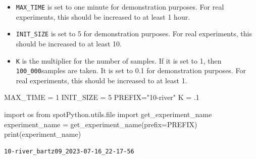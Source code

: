 \documentclass[
  letterpaper,
  DIV=11,
  numbers=noendperiod]{scrreprt}
\newenvironment{Shaded}{\begin{snugshade}}{\end{snugshade}}
\newcommand{\BuiltInTok}[1]{\textcolor[rgb]{0.00,0.23,0.31}{#1}}
\newcommand{\DecValTok}[1]{\textcolor[rgb]{0.68,0.00,0.00}{#1}}
\newcommand{\FloatTok}[1]{\textcolor[rgb]{0.68,0.00,0.00}{#1}}
\newcommand{\ImportTok}[1]{\textcolor[rgb]{0.00,0.46,0.62}{#1}}
\newcommand{\NormalTok}[1]{\textcolor[rgb]{0.00,0.23,0.31}{#1}}
\newcommand{\OperatorTok}[1]{\textcolor[rgb]{0.37,0.37,0.37}{#1}}
\newcommand{\StringTok}[1]{\textcolor[rgb]{0.13,0.47,0.30}{#1}}
\providecommand{\tightlist}{%
  \setlength{\itemsep}{0pt}\setlength{\parskip}{0pt}}\usepackage{longtable,booktabs,array}
\begin{document}
\begin{tcolorbox}[enhanced jigsaw, left=2mm, title=\textcolor{quarto-callout-caution-color}{\faFire}\hspace{0.5em}{Caution: Run time and initial design size should be increased for real
experiments}, titlerule=0mm, toprule=.15mm, leftrule=.75mm, colbacktitle=quarto-callout-caution-color!10!white, colback=white, arc=.35mm, toptitle=1mm, bottomtitle=1mm, colframe=quarto-callout-caution-color-frame, bottomrule=.15mm, rightrule=.15mm, breakable, coltitle=black, opacitybacktitle=0.6, opacityback=0]

\begin{itemize}
\tightlist
\item
  \texttt{MAX\_TIME} is set to one minute for demonstration purposes.
  For real experiments, this should be increased to at least 1 hour.
\item
  \texttt{INIT\_SIZE} is set to 5 for demonstration purposes. For real
  experiments, this should be increased to at least 10.
\item
  \texttt{K} is the multiplier for the number of samples. If it is set
  to 1, then \texttt{100\_000}samples are taken. It is set to 0.1 for
  demonstration purposes. For real experiments, this should be increased
  to at least 1.
\end{itemize}

\end{tcolorbox}

\begin{Shaded}
\begin{Highlighting}[]
\NormalTok{MAX\_TIME }\OperatorTok{=} \DecValTok{1}
\NormalTok{INIT\_SIZE }\OperatorTok{=} \DecValTok{5}
\NormalTok{PREFIX}\OperatorTok{=}\StringTok{"10{-}river"}
\NormalTok{K }\OperatorTok{=} \FloatTok{.1}
\end{Highlighting}
\end{Shaded}

\begin{Shaded}
\begin{Highlighting}[]
\ImportTok{import}\NormalTok{ os}
\ImportTok{from}\NormalTok{ spotPython.utils.}\BuiltInTok{file} \ImportTok{import}\NormalTok{ get\_experiment\_name}
\NormalTok{experiment\_name }\OperatorTok{=}\NormalTok{ get\_experiment\_name(prefix}\OperatorTok{=}\NormalTok{PREFIX)}
\BuiltInTok{print}\NormalTok{(experiment\_name)}
\end{Highlighting}
\end{Shaded}

\begin{verbatim}
10-river_bartz09_2023-07-16_22-17-56
\end{verbatim}
\end{document}
